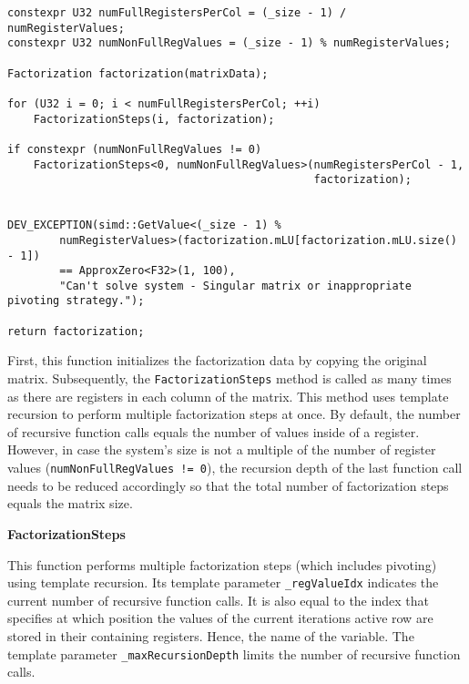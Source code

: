 \begin{verbatim}
constexpr U32 numFullRegistersPerCol = (_size - 1) / numRegisterValues;
constexpr U32 numNonFullRegValues = (_size - 1) % numRegisterValues;

Factorization factorization(matrixData);

for (U32 i = 0; i < numFullRegistersPerCol; ++i)
    FactorizationSteps(i, factorization);

if constexpr (numNonFullRegValues != 0)
    FactorizationSteps<0, numNonFullRegValues>(numRegistersPerCol - 1, 
                                               factorization);


DEV_EXCEPTION(simd::GetValue<(_size - 1) % 
        numRegisterValues>(factorization.mLU[factorization.mLU.size() - 1]) 
        == ApproxZero<F32>(1, 100),
        "Can't solve system - Singular matrix or inappropriate pivoting strategy.");

return factorization;
\end{verbatim}

First, this function initializes the factorization data by copying the original matrix.
Subsequently, the \texttt{FactorizationSteps} method is called as many times as there are registers in each column of the matrix.
This method uses template recursion to perform multiple factorization steps at once.
By default, the number of recursive function calls equals the number of values inside of a register.
However, in case the system's size is not a multiple of the number of register values (\texttt{numNonFullRegValues != 0}), the recursion depth of the last function call needs to be reduced accordingly so that the total number of factorization steps equals the matrix size.



\vspace{1cm}
\textbf{FactorizationSteps}
\vspace{0.5cm}

This function performs multiple factorization steps (which includes pivoting) using template recursion.
Its template parameter \texttt{_regValueIdx} indicates the current number of recursive function calls.
It is also equal to the index that specifies at which position the values of the current iterations active row are stored in their containing registers.
Hence, the name of the variable.
The template parameter \texttt{_maxRecursionDepth} limits the number of recursive function calls.

